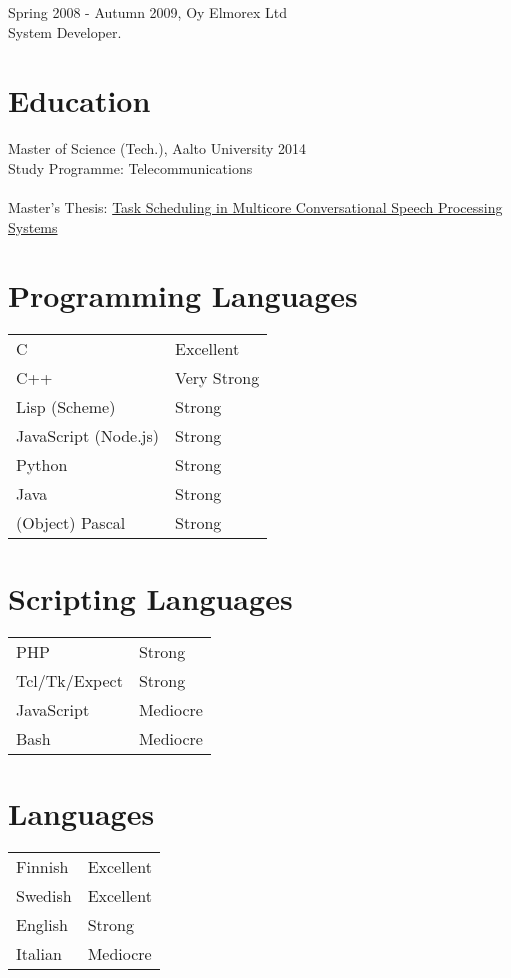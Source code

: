 \documentclass[12pt]{article}
\begin{document}
\large{Spring 2008 - Autumn 2009, Oy Elmorex Ltd}\\
\normalsize{System Developer.}\\


\section*{Education}

\large{Master of Science (Tech.), Aalto University 2014}\\
\normalsize{
Study Programme: Telecommunications\\
\\
Master's Thesis:
\href{https://aaltodoc.aalto.fi/bitstream/handle/123456789/14402/master_
Lindroos_Michele_2014.pdf?sequence=1}
{Task Scheduling in Multicore Conversational Speech Processing Systems}
}


\section*{Programming Languages}

\begin{tabular}{ll}
C & Excellent\\
C++ & Very Strong\\
Lisp (Scheme) & Strong\\
JavaScript (Node.js) & Strong\\
Python & Strong\\
Java & Strong\\
(Object) Pascal & Strong\\
\end{tabular}


\section*{Scripting Languages}

\begin{tabular}{ll}
PHP & Strong\\
Tcl/Tk/Expect & Strong\\
JavaScript & Mediocre\\
Bash & Mediocre\\
\end{tabular}


\section*{Languages}
\begin{tabular}{ll}
Finnish & Excellent\\
Swedish & Excellent\\
English & Strong\\
Italian & Mediocre\\
\end{tabular}
\end{document}
